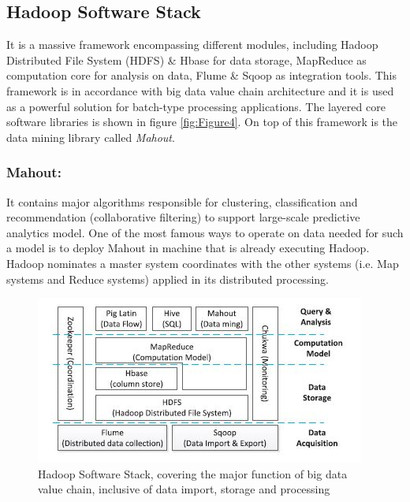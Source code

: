 \documentclass[runningheads]{llncs}
\begin{document}
\subsection{Hadoop Software Stack}
It is a massive framework encompassing different modules, including Hadoop Distributed File System (HDFS) \& Hbase for data storage, MapReduce as computation core for analysis on data, Flume \&  Sqoop as integration tools. This framework is in accordance with big data value chain architecture and it is used as a powerful solution for batch-type processing applications. The layered core software libraries is shown in figure \ref{fig:Figure4}. On top of this framework is the data mining library called \textit{Mahout}. \subsubsection{Mahout:}It contains major algorithms responsible for clustering, classification and recommendation (collaborative filtering) to support large-scale predictive analytics model. One of the most famous ways to operate on data needed for such a model is to deploy Mahout in machine that is already executing Hadoop\cite{12}. Hadoop nominates a master system coordinates with the other systems (i.e. Map systems and Reduce systems) applied in its distributed processing.

\begin{figure}[htbp]
	\centering
	\vspace{0.85cm}
	\hspace*{-0.45cm}
	
	\includegraphics[scale=0.7]{Figure6.jpg}
	\caption{Hadoop Software Stack, covering the major function of big data value chain, inclusive of data import, storage and processing}
	\label{fig:Figure5}
	\vspace{-0.5em}
\end{figure}
\end{document}
